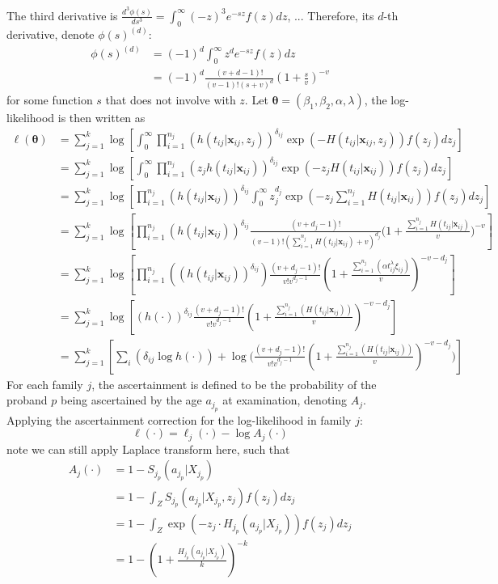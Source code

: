 \documentclass[preprint,12pt]{elsarticle}
\begin{document}
\noindent
The third derivative is $\frac{d^3\phi(s)}{ds^3}=\int_0^{\infty}(-z)^3e^{-sz}f(z)dz$, ...
Therefore, its $d$-th derivative, denote $\phi(s)^{(d)}$:
\begin{align}
    \phi(s)^{(d)}&=(-1)^d\int_0^{\infty}z^de^{-sz}f(z)dz\\
    &=(-1)^d\frac{(v+d-1)!}{(v-1)!(s+v)^d}(1+\frac{s}{v})^{-v}
\end{align}
for some function $s$ that does not involve with $z$. Let $\boldsymbol{\theta}=(\beta_1, \beta_2, \alpha, \lambda)$, the log-likelihood is then written as
\begin{align}
    \ell(\boldsymbol{\theta})&=\sum_{j=1}^k\log \left [ \int_0^{\infty}\prod_{i=1}^{n_j}(h(t_{ij}|\mathbf{x}_{ij}, z_j))^{\delta_{ij}}\exp (-H(t_{ij}|\mathbf{x}_{ij}, z_j))f(z_j)dz_j\right ]\\
    &=\sum_{j=1}^k\log\left [\int_{0}^{\infty}\prod_{i=1}^{n_j}(z_j h(t_{ij}|\mathbf{x}_{ij}))^{\delta_{ij}}\exp(-z_j H(t_{ij}|\mathbf{x}_{ij}))f(z_j)dz_j\right ]\\
    &=\sum_{j=1}^k\log\left [\prod_{i=1}^{n_j}(h(t_{ij}|\mathbf{x}_{ij}))^{\delta_{ij}}\int_0^{\infty}z_j^{d_j}\exp(-z_j\sum_{i=1}^{n_j}H(t_{ij}|\mathbf{x}_{ij}))f(z_j)dz_j \right ]\\
    &=\sum_{j=1}^k\log\left [\prod_{i=1}^{n_j}(h(t_{ij}|\mathbf{x}_{ij}))^{\delta_{ij}}\frac{(v+d_j-1)!}{(v-1)!(\sum_{i=1}^{n_j}H(t_{ij}|\mathbf{x}_{ij})+v)^{d_j}}\Big(1+\frac{\sum_{i=1}^{n_j}H(t_{ij}|\mathbf{x}_{ij})}{v}\Big)^{-v}\right ]\\
    &=\sum_{j=1}^k\log\left [\prod_{i=1}^{n_j}((h(t_{ij}|\mathbf{x}_{ij}) )^{\delta_{ij}})\frac{(v+d_j-1)!}{v!v^{d_j-1}}(1+\frac{\sum_{i=1}^{n_j}(\alpha t_{ij}^{\lambda}\xi_{ij})}{v})^{-v-d_j} \right ]\\
    &=\sum_{j=1}^k\log\left [(h(\cdot))^{\delta_{ij}} \frac{(v+d_j-1)!}{v!v^{d_j-1}}(1+\frac{\sum_{i=1}^{n_j}(H(t_{ij}|\mathbf{x}_{ij}))}{v})^{-v-d_j} \right ]\\
    &=\sum_{j=1}^k\left [\sum_i(\delta_{ij}\log h(\cdot)) + \log\Big (\frac{(v+d_j-1)!}{v!v^{d_j-1}}(1+\frac{\sum_{i=1}^{n_j}(H(t_{ij}|\mathbf{x}_{ij}))}{v})^{-v-d_j}\Big )\right ]
\end{align}
For each family $j$, the ascertainment is defined to be the probability of the proband $p$ being ascertained by the age $a_{j_p}$ at examination, denoting $A_j$. Applying the ascertainment correction for the log-likelihood in family $j$: 
\begin{equation}
    \ell(\cdot)=\ell_j(\cdot)-\log A_j(\cdot)
\end{equation}
note we can still apply Laplace transform here, such that
\begin{align}
    A_j(\cdot)&=1-S_{j_p}(a_{j_p}|X_{j_p})\\
    &=1-\int_Z S_{j_p}(a_{j_p}|X_{j_p},z_j)f(z_j)dz_j\\
    &=1-\int_Z\exp(-z_j\cdot H_{j_p}(a_{j_p}|X_{j_p}))f(z_j)dz_j\\
    &=1-(1+\frac{H_{j_p}(a_{j_p}|X_{j_p})}{k})^{-k}
\end{align}
\end{document}
